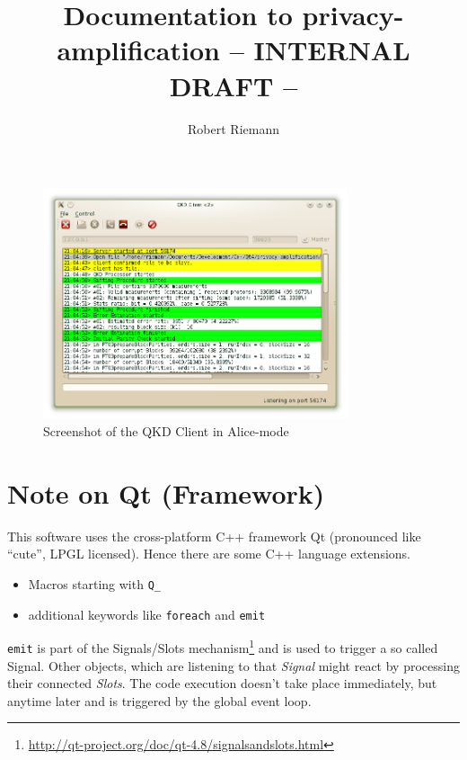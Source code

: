 \documentclass[a4paper,pdftex,DIV18,parskip=half+]{scrartcl}
\title{Documentation to privacy-amplification \newline – INTERNAL DRAFT –}
\author{Robert Riemann}
\begin{document}
\maketitle

\begin{figure}[htb!]
  \centering
  \includegraphics[width=0.8\textwidth,keepaspectratio=true]{./screenshot.png}
  \caption{Screenshot of the QKD Client in Alice-mode}
\end{figure}



\section*{Note on Qt (Framework)}

This software uses the cross-platform C++ framework Qt (pronounced like “cute”, LPGL licensed). Hence there
are some C++ language extensions.

\begin{itemize}
  \item Macros starting with \texttt{Q\_}
  \item additional keywords like \texttt{foreach} and \texttt{emit}
\end{itemize}

\texttt{emit} is part of the Signals/Slots mechanism\footnote{%
\url{http://qt-project.org/doc/qt-4.8/signalsandslots.html}} and is used to
trigger a so called Signal. Other objects, which are listening to that \emph{Signal}
might react by processing their connected \emph{Slots}. The code execution doesn't
take place immediately, but anytime later and is triggered by the global event loop.
\end{document}
